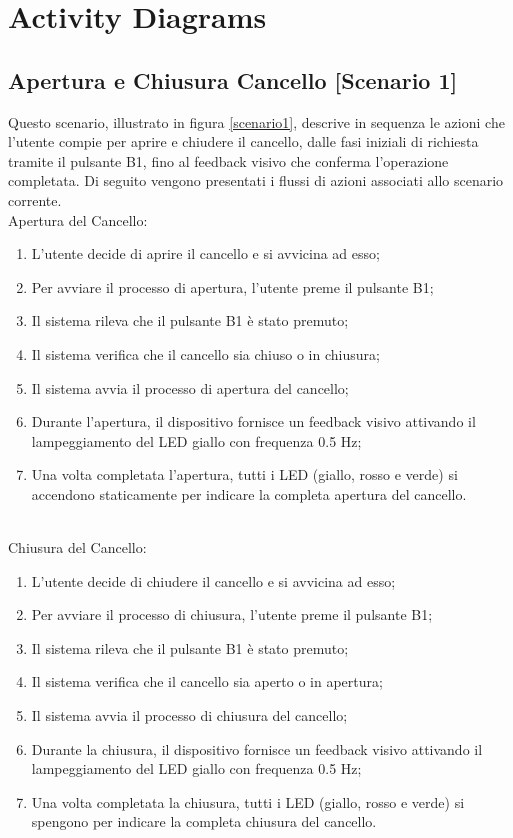 \chapter{\bf{Activity Diagrams}}

\section{Apertura e Chiusura Cancello [Scenario 1]}
Questo scenario, illustrato in figura \ref{scenario1}, descrive in sequenza le azioni che l’utente compie per aprire e chiudere il cancello, dalle fasi iniziali di richiesta tramite il pulsante B1, fino al feedback visivo che conferma l'operazione completata.
Di seguito vengono presentati i flussi di azioni associati allo scenario corrente. \\

\noindent Apertura del Cancello:
\begin{enumerate}
    \item L’utente decide di aprire il cancello e si avvicina ad esso;
    \item Per avviare il processo di apertura, l’utente preme il pulsante B1;
    \item Il sistema rileva che il pulsante B1 è stato premuto;
    \item Il sistema verifica che il cancello sia chiuso o in chiusura;
    \item Il sistema avvia il processo di apertura del cancello;
    \item Durante l'apertura, il dispositivo fornisce un feedback visivo attivando il lampeggiamento del LED giallo con frequenza 0.5 Hz;
    \item Una volta completata l'apertura, tutti i LED (giallo, rosso e verde) si accendono staticamente per indicare la completa apertura del cancello.
\end{enumerate}

\noindent \\ Chiusura del Cancello:
\begin{enumerate}
    \item L’utente decide di chiudere il cancello e si avvicina ad esso;
    \item Per avviare il processo di chiusura, l’utente preme il pulsante B1;
    \item Il sistema rileva che il pulsante B1 è stato premuto;
    \item Il sistema verifica che il cancello sia aperto o in apertura;
    \item Il sistema avvia il processo di chiusura del cancello;
    \item Durante la chiusura, il dispositivo fornisce un feedback visivo attivando il lampeggiamento del LED giallo con frequenza 0.5 Hz;
    \item Una volta completata la chiusura, tutti i LED (giallo, rosso e verde) si spengono per indicare la completa chiusura del cancello.
\end{enumerate}

